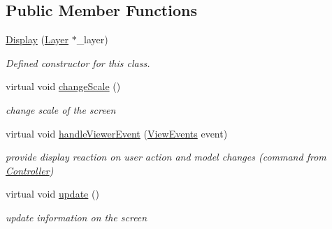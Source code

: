 \subsection*{Public Member Functions}
\begin{DoxyCompactItemize}
\item 
\hyperlink{class_display_a26d0e334f62107584f42e8fa3608f546}{Display} (\hyperlink{class_layer}{Layer} $\ast$\+\_\+layer)
\begin{DoxyCompactList}\small\item\em Defined constructor for this class. \end{DoxyCompactList}\item 
\mbox{\label{class_display_ab4a3db38f39ad17537c58cbd17bc0d04}} 
virtual void \hyperlink{class_display_ab4a3db38f39ad17537c58cbd17bc0d04}{change\+Scale} ()
\begin{DoxyCompactList}\small\item\em change scale of the screen \end{DoxyCompactList}\item 
virtual void \hyperlink{class_display_a0383047ebb0be089fe56826e84f9fcf1}{handle\+Viewer\+Event} (\hyperlink{_events_8h_a7e30376069ab6f940d101ae67eb3fb34}{View\+Events} event)
\begin{DoxyCompactList}\small\item\em provide display reaction on user action and model changes (command from \hyperlink{class_controller}{Controller}) \end{DoxyCompactList}\item 
\mbox{\label{class_display_ad2740b779d61e461c4dcaaf34f1fcd8f}} 
virtual void \hyperlink{class_display_ad2740b779d61e461c4dcaaf34f1fcd8f}{update} ()
\begin{DoxyCompactList}\small\item\em update information on the screen \end{DoxyCompactList}\end{DoxyCompactItemize}
